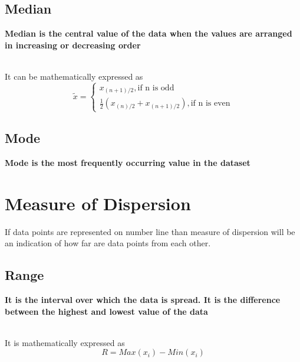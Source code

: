 \documentclass[twoside,12pt]{report}  %
\begin{document}
\subsection{Median}
\begin{tcolorbox}[colback=red!5!white,colframe=red!75!black, title= \textbf{Median}]
	\textbf{Median is the central value of the data when the values are arranged in increasing or decreasing order}
\end{tcolorbox}
\noindent
\\
It can be mathematically expressed as
$$\widetilde{x} = \left\{
				   		\begin{array}{ll}
				   			x_{(n+1)/2}, \mbox{if n is odd}                                      \\
				   			\frac{1}{2}\left(x_{(n)/2} + x_{(n+1)/2}\right), \mbox{if n is even}
				   		\end{array}	
                    \right.
$$
\subsection{Mode}
\begin{tcolorbox}[colback=red!5!white,colframe=red!75!black, title= \textbf{Mode}]
	\textbf{Mode is the most frequently occurring value in the dataset} 
\end{tcolorbox}

\section{Measure of Dispersion}
If data points are represented on number line than measure of dispersion will be an indication of how far are data points from each other. 
\subsection{Range}
\begin{tcolorbox}[colback=red!5!white,colframe=red!75!black, title= \textbf{Range}]
	\textbf{It is the interval over which the data is spread. It is the difference between the highest and lowest value of the data} 
\end{tcolorbox}
\noindent
\\
It is mathematically expressed as
$$ R = Max(x_{i}) - Min(x_{i})$$
\end{document}
